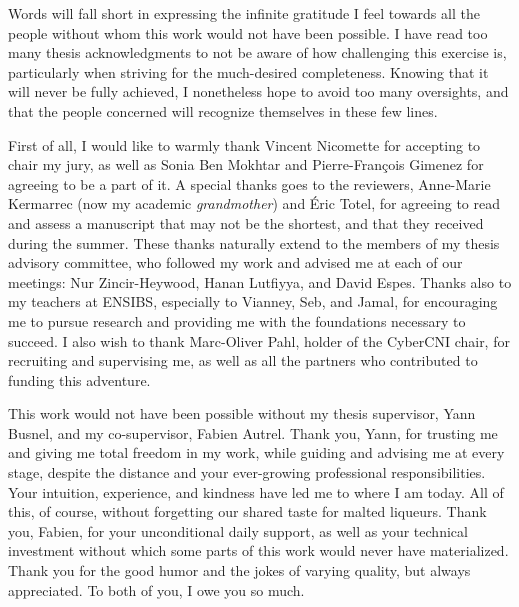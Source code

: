 Words will fall short in expressing the infinite gratitude I feel towards all the people without whom this work would not have been possible.
I have read too many thesis acknowledgments to not be aware of how challenging this exercise is, particularly when striving for the much-desired completeness.
Knowing that it will never be fully achieved, I nonetheless hope to avoid too many oversights, and that the people concerned will recognize themselves in these few lines.

First of all, I would like to warmly thank Vincent Nicomette for accepting to chair my jury, as well as Sonia Ben Mokhtar and Pierre-François Gimenez for agreeing to be a part of it.
A special thanks goes to the reviewers, Anne-Marie Kermarrec (now my academic \emph{grandmother}) and Éric Totel, for agreeing to read and assess a manuscript that may not be the shortest, and that they received during the summer.
These thanks naturally extend to the members of my thesis advisory committee, who followed my work and advised me at each of our meetings: Nur Zincir-Heywood, Hanan Lutfiyya, and David Espes.
Thanks also to my teachers at ENSIBS, especially to Vianney, Seb, and Jamal, for encouraging me to pursue research and providing me with the foundations necessary to succeed.
I also wish to thank Marc-Oliver Pahl, holder of the CyberCNI chair, for recruiting and supervising me, as well as all the partners who contributed to funding this adventure.

This work would not have been possible without my thesis supervisor, Yann Busnel, and my co-supervisor, Fabien Autrel.
Thank you, Yann, for trusting me and giving me total freedom in my work, while guiding and advising me at every stage, despite the distance and your ever-growing professional responsibilities.
Your intuition, experience, and kindness have led me to where I am today.
All of this, of course, without forgetting our shared taste for malted liqueurs.
Thank you, Fabien, for your unconditional daily support, as well as your technical investment without which some parts of this work would never have materialized.
Thank you for the good humor and the jokes of varying quality, but always appreciated.
To both of you, I owe you so much.


